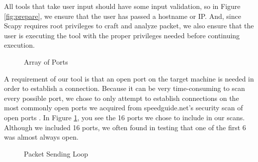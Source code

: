 All tools that take user input should have some input validation, so in Figure \ref{fig:prepare}, we ensure that the user has passed a hostname or IP.  And, since Scapy requires root privileges to craft and analyze packet, we also ensure that the user is executing the tool with the proper privileges needed before continuing execution.

\begin{figure}
	\caption{\label{fig:ports} Array of Ports}
\end{figure}

A requirement of our tool is that an open port on the target machine is needed in order to establish a connection.  Because it can be very time-consuming to scan every possible port, we chose to only attempt to establish connections on the most commonly open ports we acquired from speedguide.net's security scan of open ports \cite{commonports}. In Figure \ref{fig:ports}, you see the 16 ports we chose to include in our scans.  Although we included 16 ports, we often found in testing that one of the first 6 was almost always open.

\begin{figure}
	\caption{\label{fig:loop} Packet Sending Loop}
\end{figure}

